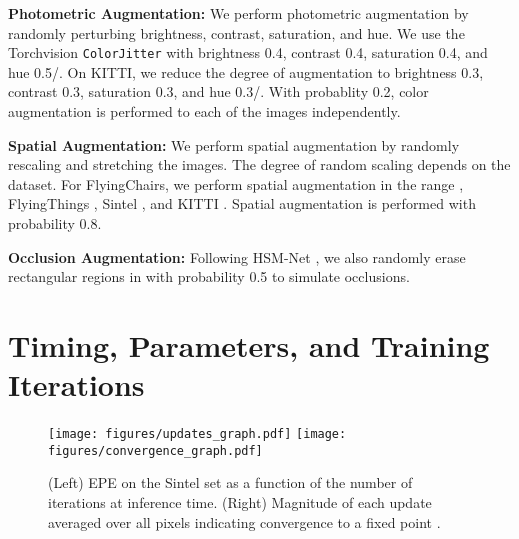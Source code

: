 \documentclass[runningheads]{llncs}
\begin{document}
\noindent \textbf{Photometric Augmentation: } We perform photometric augmentation by randomly perturbing brightness, contrast, saturation, and hue. We use the Torchvision \texttt{ColorJitter} with brightness 0.4, contrast 0.4, saturation 0.4, and hue 0.5/. On KITTI, we reduce the degree of augmentation to brightness 0.3, contrast 0.3, saturation 0.3, and hue 0.3/. With probablity 0.2, color augmentation is performed to each of the images independently. 

\vspace{1mm}
\noindent \textbf{Spatial Augmentation: } We perform spatial augmentation by randomly rescaling and stretching the images. The degree of random scaling depends on the dataset. For FlyingChairs, we perform spatial augmentation in the range , FlyingThings , Sintel , and KITTI . Spatial augmentation is performed with probability 0.8. 

\vspace{1mm}
\noindent \textbf{Occlusion Augmentation: } Following HSM-Net \cite{hsm}, we also randomly erase rectangular regions in  with probability 0.5 to simulate occlusions.

\section{Timing, Parameters, and Training Iterations}

\begin{figure}[h]
    \vspace{-8mm}
	\hspace{-2mm}\texttt{[image: figures/updates\_graph.pdf]}
	\hspace{-2mm}\texttt{[image: figures/convergence\_graph.pdf]}
	\vspace{-3mm}
	\caption{(Left) EPE on the Sintel set as a function of the number of iterations at inference time. (Right) Magnitude of each update  averaged over all pixels indicating convergence to a fixed point .}
	\label{fig:Convergence}
	\vspace{-6mm}
\end{figure}
\end{document}
